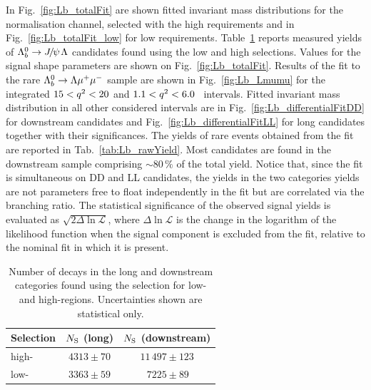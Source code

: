 %
In Fig.~\ref{fig:Lb_totalFit} are shown fitted invariant mass distributions for the normalisation channel,
selected with the high \qsq requirements and in Fig.~\ref{fig:Lb_totalFit_low} for low \qsq requirements.
Table~\ref{tab:Lb_rawYieldJpsi} reports measured yields of $\Lb\ra\jpsi\Lz$ candidates found using the low and high \qsq selections.
Values for the signal shape parameters are shown on Fig.~\ref{fig:Lb_totalFit}.
Results of the fit to the rare $\Lambda^0_b\rightarrow\Lambda\mu^+\mu^-$ sample are shown in Fig.~\ref{fig:Lb_Lmumu} for the integrated
$15 < q^2 < 20$ and $1.1 < q^2 < 6.0$ \gevgevcccc ~\qsq intervals.
Fitted invariant mass distribution in all other considered \qsq intervals are in Fig.~\ref{fig:Lb_differentialFitDD}
for downstream candidates and Fig.~\ref{fig:Lb_differentialFitLL} for long candidates together with their significances.
The yields of rare events obtained from the fit are reported in Tab.~\ref{tab:Lb_rawYield}.
Most candidates are found in the downstream sample comprising $\sim 80\,\%$ of the total yield.
Notice that, since the fit is simultaneous on DD and LL candidates, the yields in the two categories yields
are not parameters free to float independently in the fit but are correlated via the branching ratio.
The statistical significance of the observed signal yields is evaluated as $\sqrt{2\Delta\ln{\mathcal{L}}}$, where
$\Delta\ln{\mathcal{L}}$ is the change in the logarithm of the likelihood function when the signal component
is excluded from the fit, relative to the nominal fit in which it is present.

\begin{table}
\centering
\caption{Number of \decay{\Lb}{\jpsi\Lz} decays in the long and
  downstream categories found using the selection for low- and
  high-\qsq regions. Uncertainties shown are statistical only.}
\begin{tabular}{lcc}
Selection & $N_{\rm S}$ (long) & $N_{\rm S}$ (downstream)\\ \hline
high-\qsq	& $4313 \pm 70$	 	&  $11\,497 \pm 123$ \\
low-\qsq	& $3363 \pm 59$ 	&  $\phantom{0}\,7225 \pm 89\phantom{0}$  \\
 \hline
\end{tabular}
\label{tab:Lb_rawYieldJpsi}
\end{table}



